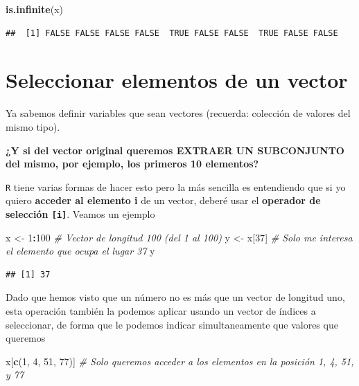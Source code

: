 \documentclass[11pt,]{book}
\newenvironment{Shaded}{\begin{snugshade}}{\end{snugshade}}
\newcommand{\CommentTok}[1]{\textcolor[rgb]{0.37,0.37,0.37}{\textit{#1}}}
\newcommand{\DecValTok}[1]{\textcolor[rgb]{0.06,0.06,0.06}{#1}}
\newcommand{\KeywordTok}[1]{\textcolor[rgb]{0.27,0.27,0.27}{\textbf{#1}}}
\newcommand{\NormalTok}[1]{#1}
\newcommand{\OperatorTok}[1]{\textcolor[rgb]{0.43,0.43,0.43}{\textbf{#1}}}
\newcommand{\StringTok}[1]{\textcolor[rgb]{0.5,0.5,0.5}{#1}}
\begin{document}
\begin{Shaded}
\begin{Highlighting}[]
\KeywordTok{is.infinite}\NormalTok{(x)}
\end{Highlighting}
\end{Shaded}

\begin{verbatim}
##  [1] FALSE FALSE FALSE FALSE  TRUE FALSE FALSE  TRUE FALSE FALSE
\end{verbatim}

\hypertarget{seleccionar-elementos-de-un-vector}{%
\section{Seleccionar elementos de un vector}\label{seleccionar-elementos-de-un-vector}}

Ya sabemos definir variables que sean vectores (recuerda: colección de valores del mismo tipo).

\textbf{¿Y si del vector original queremos EXTRAER UN SUBCONJUNTO del mismo, por ejemplo, los primeros 10 elementos?}

\texttt{R} tiene varias formas de hacer esto pero la más sencilla es entendiendo que si yo quiero \textbf{acceder al elemento i} de un vector, deberé usar el \textbf{operador de selección \texttt{{[}i{]}}}. Veamos un ejemplo

\begin{Shaded}
\begin{Highlighting}[]
\NormalTok{x <-}\StringTok{ }\DecValTok{1}\OperatorTok{:}\DecValTok{100} \CommentTok{# Vector de longitud 100 (del 1 al 100)}
\NormalTok{y <-}\StringTok{ }\NormalTok{x[}\DecValTok{37}\NormalTok{] }\CommentTok{# Solo me interesa el elemento que ocupa el lugar 37}
\NormalTok{y}
\end{Highlighting}
\end{Shaded}

\begin{verbatim}
## [1] 37
\end{verbatim}

Dado que hemos visto que un número no es más que un vector de longitud uno, esta operación también la podemos aplicar usando un vector de índices a seleccionar, de forma que le podemos indicar simultaneamente que valores que queremos

\begin{Shaded}
\begin{Highlighting}[]
\NormalTok{x[}\KeywordTok{c}\NormalTok{(}\DecValTok{1}\NormalTok{, }\DecValTok{4}\NormalTok{, }\DecValTok{51}\NormalTok{, }\DecValTok{77}\NormalTok{)] }\CommentTok{# Solo queremos acceder a los elementos en la posición 1, 4, 51, y 77}
\end{Highlighting}
\end{Shaded}
\end{document}
